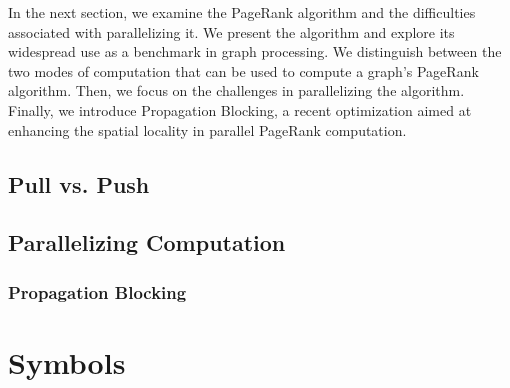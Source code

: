 In the next section, we examine the PageRank algorithm and the difficulties associated with parallelizing it. We present the algorithm and explore its widespread use as a benchmark in graph processing. We distinguish between the two modes of computation that can be used to compute a graph's PageRank algorithm. Then, we focus on the challenges in parallelizing the algorithm. Finally, we introduce Propagation Blocking, a recent optimization aimed at enhancing the spatial locality in parallel PageRank computation.
\subsection{Pull vs. Push}
\subsection{Parallelizing Computation}
\par{
}
\subsubsection{Propagation Blocking}
\section{Symbols}
